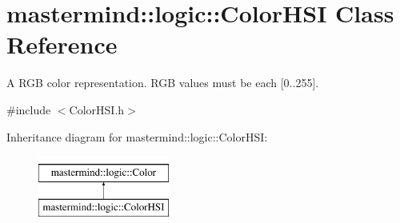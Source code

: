 \hypertarget{classmastermind_1_1logic_1_1_color_h_s_i}{}\section{mastermind\+:\+:logic\+:\+:Color\+H\+SI Class Reference}
\label{classmastermind_1_1logic_1_1_color_h_s_i}


A R\+GB color representation. R\+GB values must be each \mbox{[}0..255\mbox{]}.  




{\ttfamily \#include $<$Color\+H\+S\+I.\+h$>$}

Inheritance diagram for mastermind\+:\+:logic\+:\+:Color\+H\+SI\+:\begin{figure}[H]
\begin{center}
\leavevmode
\includegraphics[height=2.000000cm]{classmastermind_1_1logic_1_1_color_h_s_i}
\end{center}
\end{figure}
